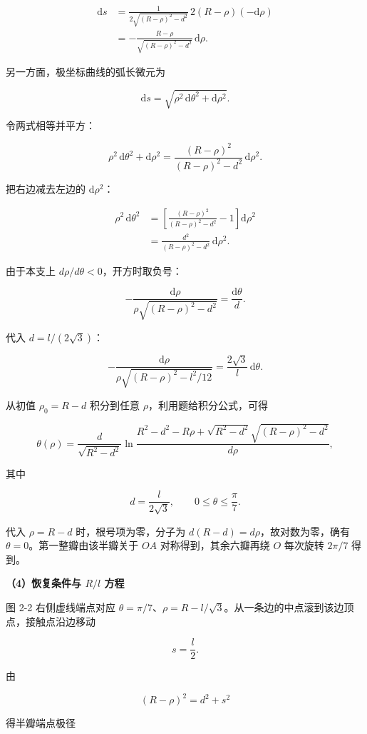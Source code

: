 \documentclass[12pt,a4paper,UTF8]{ctexart}
\begin{document}
\[\begin{aligned}
\mathrm{d}s
&=\frac{1}{2\sqrt{(R-\rho)^2-d^2}}\,2(R-\rho)(-\mathrm{d}\rho)\\
&=-\frac{R-\rho}{\sqrt{(R-\rho)^2-d^2}}\,\mathrm{d}\rho.
\end{aligned}\]

另一方面，极坐标曲线的弧长微元为

\[\mathrm{d}s=\sqrt{\rho^2\,\mathrm{d}\theta^2+\mathrm{d}\rho^2}.\]

令两式相等并平方：

\[\rho^2\,\mathrm{d}\theta^2+\mathrm{d}\rho^2
=\frac{(R-\rho)^2}{(R-\rho)^2-d^2}\,\mathrm{d}\rho^2.\]

把右边减去左边的 \(\mathrm{d}\rho^2\)：

\[\begin{aligned}
\rho^2\,\mathrm{d}\theta^2
&=\left[
\frac{(R-\rho)^2}{(R-\rho)^2-d^2}-1
\right]\mathrm{d}\rho^2\\
&=\frac{d^2}{(R-\rho)^2-d^2}\,\mathrm{d}\rho^2.
\end{aligned}\]

由于本支上 \(d\rho/d\theta<0\)，开方时取负号：

\[\boxed{
-\frac{\mathrm{d}\rho}{\rho\sqrt{(R-\rho)^2-d^2}}
=\frac{\mathrm{d}\theta}{d}
}.\]

代入 \(d=l/(2\sqrt3)\)：

\[-\frac{\mathrm{d}\rho}{\rho\sqrt{(R-\rho)^2-l^2/12}}
=\frac{2\sqrt3}{l}\,\mathrm{d}\theta.\]

从初值 \(\rho_0=R-d\) 积分到任意 \(\rho\)，利用题给积分公式，可得

\[\boxed{
\theta(\rho)=
\frac{d}{\sqrt{R^2-d^2}}
\ln\frac{
R^2-d^2-R\rho+
\sqrt{R^2-d^2}\sqrt{(R-\rho)^2-d^2}
}{d\rho}
},\]

其中

\[d=\frac{l}{2\sqrt3},\qquad 0\le\theta\le\frac{\pi}{7}.\]

代入 \(\rho=R-d\) 时，根号项为零，分子为
\(d(R-d)=d\rho\)，故对数为零，确有 \(\theta=0\)。第一整瓣由该半瓣关于
\(OA\) 对称得到，其余六瓣再绕 \(O\) 每次旋转 \(2\pi/7\) 得到。

\textbf{（4）恢复条件与 \(R/l\) 方程}

图 2-2 右侧虚线端点对应
\(\theta=\pi/7\)、\(\rho=R-l/\sqrt3\)。从一条边的中点滚到该边顶点，接触点沿边移动

\[s=\frac{l}{2}.\]

由

\[(R-\rho)^2=d^2+s^2\]

得半瓣端点极径
\end{document}
